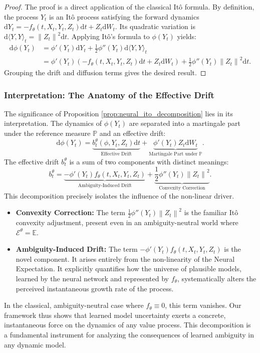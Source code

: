 \documentclass[qian]{imsart}
\newcommand{\Prob}{\mathbb{P}}
\newcommand{\E}{\mathbb{E}}
\newcommand{\cEneutheta}{\mathcal{E}^{\theta}}
\newcommand{\dd}{\mathrm{d}}
\newcommand{\norm}[1]{\left\lVert#1\right\rVert}
\theoremstyle{plain}
\theoremstyle{definition}
\begin{document}
\begin{proof}
The proof is a direct application of the classical Itô formula. By definition, the process $Y_t$ is an Itô process satisfying the forward dynamics $\dd Y_t = -f_\theta(t, X_t, Y_t, Z_t) \dd t + Z_t \dd W_t$. Its quadratic variation is $\dd\langle Y, Y \rangle_t = \norm{Z_t}^2 \dd t$. Applying Itô's formula to $\phi(Y_t)$ yields:
\begin{align*}
\dd \phi(Y_t) &= \phi'(Y_t) \dd Y_t + \frac{1}{2}\phi''(Y_t) \dd\langle Y, Y \rangle_t \\
&= \phi'(Y_t) \left( -f_\theta(t, X_t, Y_t, Z_t)\dd t + Z_t \dd W_t \right) + \frac{1}{2}\phi''(Y_t) \norm{Z_t}^2 \dd t.
\end{align*}
Grouping the drift and diffusion terms gives the desired result.
\end{proof}

\subsubsection{Interpretation: The Anatomy of the Effective Drift}
The significance of Proposition \ref{prop:neural_ito_decomposition} lies in its interpretation. The dynamics of $\phi(Y_t)$ are separated into a martingale part under the reference measure $\Prob$ and an effective drift:
\[ \dd \phi(Y_t) = \underbrace{b^\theta_t(\phi, Y_t, Z_t) \dd t}_{\text{Effective Drift}} + \underbrace{\phi'(Y_t)Z_t \dd W_t}_{\text{Martingale Part under } \Prob}. \]
The effective drift $b^\theta_t$ is a sum of two components with distinct meanings:
\[ b^\theta_t = \underbrace{-\phi'(Y_t)f_\theta(t, X_t, Y_t, Z_t)}_{\text{Ambiguity-Induced Drift}} + \underbrace{\frac{1}{2}\phi''(Y_t)\norm{Z_t}^2}_{\text{Convexity Correction}}. \]
This decomposition precisely isolates the influence of the non-linear driver.
\begin{itemize}
    \item \textbf{Convexity Correction:} The term $\frac{1}{2}\phi''(Y_t)\norm{Z_t}^2$ is the familiar Itô convexity adjustment, present even in an ambiguity-neutral world where $\cEneutheta = \E$.
    \item \textbf{Ambiguity-Induced Drift:} The term $-\phi'(Y_t)f_\theta(t, X_t, Y_t, Z_t)$ is the novel component. It arises entirely from the non-linearity of the Neural Expectation. It explicitly quantifies how the universe of plausible models, learned by the neural network and represented by $f_\theta$, systematically alters the perceived instantaneous growth rate of the process.
\end{itemize}
In the classical, ambiguity-neutral case where $f_\theta \equiv 0$, this term vanishes. Our framework thus shows that learned model uncertainty exerts a concrete, instantaneous force on the dynamics of any value process. This decomposition is a fundamental instrument for analyzing the consequences of learned ambiguity in any dynamic model.
\end{document}
